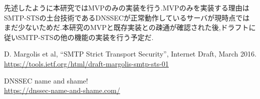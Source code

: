 \documentclass[a4j,10pt]{jsarticle}
\begin{document}
先述したように本研究ではMVPのみの実装を行う.MVPのみを実装する理由はSMTP-STSの土台技術であるDNSSECが正常動作しているサーバが現時点ではまだ少ないためだ.\cite{dnssec}本研究のMVPと既存実装との疎通が確認された後,ドラフトに従いSMTP-STSの他の機能の実装を行う予定だ.

\begin{thebibliography}{9}
D. Margolis et al, “SMTP Strict Transport Security”, Internet Draft, March 2016.\\
\url{https://tools.ietf.org/html/draft-margolis-smtp-sts-01}

DNSSEC name and shame!\\
\url{ https://dnssec-name-and-shame.com/}
\end{thebibliography}
\end{document}

